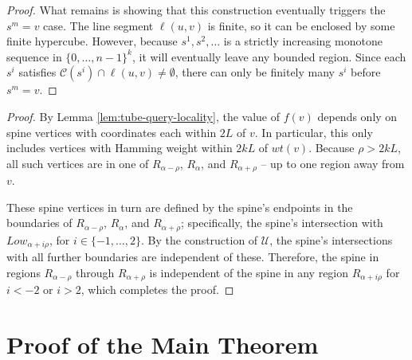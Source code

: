 \documentclass[11pt]{article}
\begin{document}
\begin{proof}
What remains  is showing that this construction eventually triggers the $s^m = v$ case. The line segment $\ell(u, v)$ is finite, so it can be enclosed by some finite hypercube. However, because $s^1, s^2, \ldots$ is a strictly increasing monotone sequence in $\{0, \ldots, n-1\}^k$, it will eventually leave any bounded region. Since each $s^i$ satisfies $\mathcal{C}(s^i) \cap \ell(u, v) \neq \emptyset$, there can only be finitely many $s^i$ before $s^m = v$.
\end{proof}


\lemqueryaffectsadjacentonly*
\begin{proof}
     By Lemma \ref{lem:tube-query-locality}, the value of $f(v)$ depends only on spine vertices with coordinates each within $2L$ of $v$. In particular, this only includes vertices with Hamming weight within $2kL$ of $wt(v)$. Because $\rho > 2kL$, all such vertices are in one of $R_{\alpha - \rho}$, $R_{\alpha}$, and $R_{\alpha + \rho}$ -- up to one region away from $v$.

    These spine vertices in turn are defined by the spine's endpoints in the boundaries of $R_{\alpha - \rho}$, $R_{\alpha}$, and $R_{\alpha + \rho}$; specifically, the spine's intersection with $Low_{\alpha + i\rho}$, for $i \in \{-1, \ldots, 2\}$. By the construction of $\mathcal{U}$, the spine's intersections with all further boundaries are independent of these. Therefore, the spine in regions $R_{\alpha - \rho}$ through $R_{\alpha + \rho}$ is independent of the spine in any region $R_{\alpha + i\rho}$ for $i < -2$ or $i > 2$, which completes the proof.
\end{proof}


\section{Proof of the Main Theorem} \label{app:proof_main_theorem}
\end{document}
